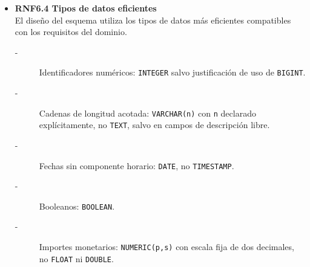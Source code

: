 \begin{itemize}
    \item \textbf{RNF6.4 Tipos de datos eficientes} \\
    El diseño del esquema utiliza los tipos de datos más eficientes
    compatibles con los requisitos del dominio.
    \begin{description}
        \item[-] Identificadores numéricos: \texttt{INTEGER} salvo justificación de uso de \texttt{BIGINT}. 
        \item[-] Cadenas de longitud acotada: \texttt{VARCHAR(n)} con \texttt{n} declarado %
        explícitamente, no \texttt{TEXT}, salvo en campos de descripción libre. 
        \item[-] Fechas sin componente horario: \texttt{DATE}, no \texttt{TIMESTAMP}.
        \item[-] Booleanos: \texttt{BOOLEAN}.
        \item[-] Importes monetarios: \texttt{NUMERIC(p,s)} con escala fija de dos %
        decimales, no \texttt{FLOAT} ni \texttt{DOUBLE}.
    \end{description}
\end{itemize}


